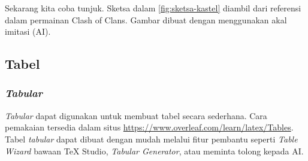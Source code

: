 \begin{enumerate}[]
    Sekarang kita coba tunjuk. Sketsa dalam \autoref{fig:sketsa-kastel} diambil dari referensi dalam permainan Clash of Clans. Gambar dibuat dengan menggunakan akal imitasi (AI).
\end{enumerate}

\subsection{Tabel}

\subsubsection{\textit{Tabular}}

\textit{Tabular} dapat digunakan untuk membuat tabel secara sederhana. Cara pemakaian tersedia dalam situs \url{https://www.overleaf.com/learn/latex/Tables}. Tabel \textit{tabular} dapat dibuat dengan mudah melalui fitur pembantu seperti \textit{Table Wizard} bawaan TeX Studio, \textit{Tabular Generator}, atau meminta tolong kepada AI.

